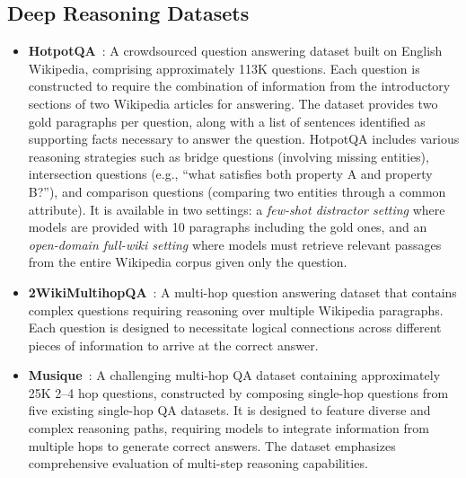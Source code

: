 \subsection{Deep Reasoning Datasets}
\begin{itemize}
    \item \textbf{HotpotQA}~\citep{yang2018hotpotqa}: A crowdsourced question answering dataset built on English Wikipedia, comprising approximately 113K questions. Each question is constructed to require the combination of information from the introductory sections of two Wikipedia articles for answering. The dataset provides two gold paragraphs per question, along with a list of sentences identified as supporting facts necessary to answer the question. HotpotQA includes various reasoning strategies such as bridge questions (involving missing entities), intersection questions (e.g., “what satisfies both property A and property B?”), and comparison questions (comparing two entities through a common attribute). It is available in two settings: a \textit{few-shot distractor setting} where models are provided with 10 paragraphs including the gold ones, and an \textit{open-domain full-wiki setting} where models must retrieve relevant passages from the entire Wikipedia corpus given only the question.
    \item \textbf{2WikiMultihopQA}~\citep{2wiki}: A multi-hop question answering dataset that contains complex questions requiring reasoning over multiple Wikipedia paragraphs. Each question is designed to necessitate logical connections across different pieces of information to arrive at the correct answer.
    \item \textbf{Musique}~\citep{musique}: A challenging multi-hop QA dataset containing approximately 25K 2–4 hop questions, constructed by composing single-hop questions from five existing single-hop QA datasets. It is designed to feature diverse and complex reasoning paths, requiring models to integrate information from multiple hops to generate correct answers. The dataset emphasizes comprehensive evaluation of multi-step reasoning capabilities.
\end{itemize}

